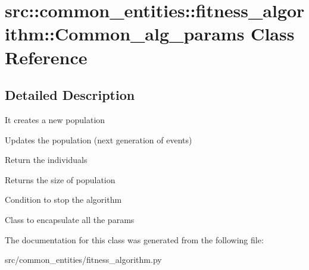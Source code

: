 \hypertarget{classsrc_1_1common__entities_1_1fitness__algorithm_1_1Common__alg__params}{
\section{src::common\_\-entities::fitness\_\-algorithm::Common\_\-alg\_\-params Class Reference}
\label{classsrc_1_1common__entities_1_1fitness__algorithm_1_1Common__alg__params}
}


\subsection{Detailed Description}
\begin{DoxyVerb}
    It creates a new population
    \end{DoxyVerb}
 \begin{DoxyVerb}
    Updates the population (next generation of events)
    \end{DoxyVerb}
 \begin{DoxyVerb}
    Return the individuals
    \end{DoxyVerb}
 \begin{DoxyVerb}
    Returns the size of population
    \end{DoxyVerb}
 \begin{DoxyVerb}
    Condition to stop the algorithm
    \end{DoxyVerb}
 \begin{DoxyVerb}
Class to encapsulate all the params
\end{DoxyVerb}
 

The documentation for this class was generated from the following file:\begin{DoxyCompactItemize}
\item 
src/common\_\-entities/fitness\_\-algorithm.py\end{DoxyCompactItemize}
